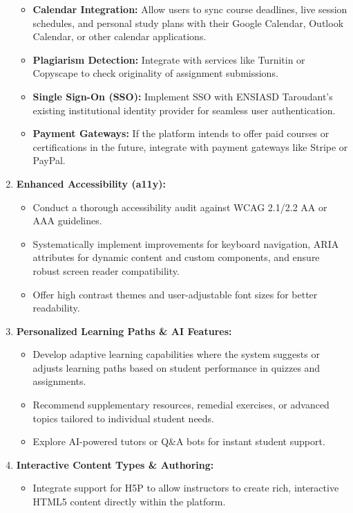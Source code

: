 \documentclass[12pt,a4paper]{article}
\begin{document}
\begin{enumerate}
\begin{itemize}
        \item \textbf{Calendar Integration:} Allow users to sync course deadlines, live session schedules, and personal study plans with their Google Calendar, Outlook Calendar, or other calendar applications.
        \item \textbf{Plagiarism Detection:} Integrate with services like Turnitin or Copyscape to check originality of assignment submissions.
        \item \textbf{Single Sign-On (SSO):} Implement SSO with ENSIASD Taroudant's existing institutional identity provider for seamless user authentication.
        \item \textbf{Payment Gateways:} If the platform intends to offer paid courses or certifications in the future, integrate with payment gateways like Stripe or PayPal.
    \end{itemize}
    \item \textbf{Enhanced Accessibility (a11y):}
    \begin{itemize}
        \item Conduct a thorough accessibility audit against WCAG 2.1/2.2 AA or AAA guidelines.
        \item Systematically implement improvements for keyboard navigation, ARIA attributes for dynamic content and custom components, and ensure robust screen reader compatibility.
        \item Offer high contrast themes and user-adjustable font sizes for better readability.
    \end{itemize}
    \item \textbf{Personalized Learning Paths \& AI Features:}
    \begin{itemize}
        \item Develop adaptive learning capabilities where the system suggests or adjusts learning paths based on student performance in quizzes and assignments.
        \item Recommend supplementary resources, remedial exercises, or advanced topics tailored to individual student needs.
        \item Explore AI-powered tutors or Q\&A bots for instant student support.
    \end{itemize}
    \item \textbf{Interactive Content Types \& Authoring:}
    \begin{itemize}
        \item Integrate support for H5P to allow instructors to create rich, interactive HTML5 content directly within the platform.

\end{itemize}
\end{enumerate}
\end{document}
